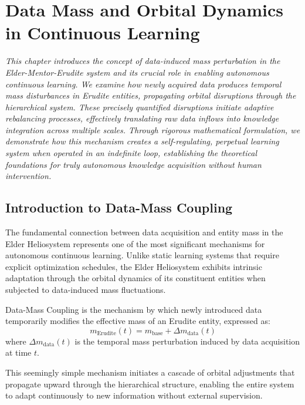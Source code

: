 \chapter{Data Mass and Orbital Dynamics in Continuous Learning}

\textit{This chapter introduces the concept of data-induced mass perturbation in the Elder-Mentor-Erudite system and its crucial role in enabling autonomous continuous learning. We examine how newly acquired data produces temporal mass disturbances in Erudite entities, propagating orbital disruptions through the hierarchical system. These precisely quantified disruptions initiate adaptive rebalancing processes, effectively translating raw data inflows into knowledge integration across multiple scales. Through rigorous mathematical formulation, we demonstrate how this mechanism creates a self-regulating, perpetual learning system when operated in an indefinite loop, establishing the theoretical foundations for truly autonomous knowledge acquisition without human intervention.}

\section{Introduction to Data-Mass Coupling}

The fundamental connection between data acquisition and entity mass in the Elder Heliosystem represents one of the most significant mechanisms for autonomous continuous learning. Unlike static learning systems that require explicit optimization schedules, the Elder Heliosystem exhibits intrinsic adaptation through the orbital dynamics of its constituent entities when subjected to data-induced mass fluctuations.

\begin{definition}
Data-Mass Coupling is the mechanism by which newly introduced data temporarily modifies the effective mass of an Erudite entity, expressed as:
\begin{equation}
m_{\text{Erudite}}(t) = m_{\text{base}} + \Delta m_{\text{data}}(t)
\end{equation}
where $\Delta m_{\text{data}}(t)$ is the temporal mass perturbation induced by data acquisition at time $t$.
\end{definition}

This seemingly simple mechanism initiates a cascade of orbital adjustments that propagate upward through the hierarchical structure, enabling the entire system to adapt continuously to new information without external supervision.

